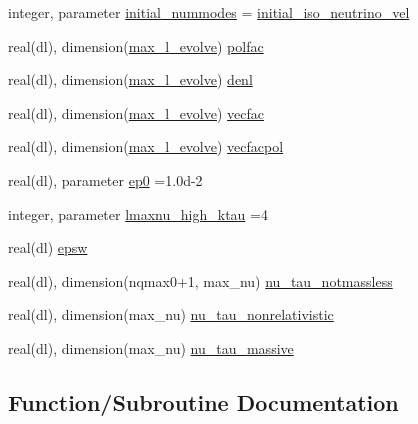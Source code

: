 \begin{DoxyCompactItemize}
\item 
integer, parameter \mbox{\hyperlink{namespacegaugeinterface_a4c1f07aacc342a123210732254937539}{initial\+\_\+nummodes}} = \mbox{\hyperlink{namespacegaugeinterface_a47175df2f7681cf8e8a2a7e2cb94952a}{initial\+\_\+iso\+\_\+neutrino\+\_\+vel}}
\item 
real(dl), dimension(\mbox{\hyperlink{namespacegaugeinterface_a965f8caba9ba282e718281110e274b04}{max\+\_\+l\+\_\+evolve}}) \mbox{\hyperlink{namespacegaugeinterface_a6e217a5a543d2b9517624820de0e3338}{polfac}}
\item 
real(dl), dimension(\mbox{\hyperlink{namespacegaugeinterface_a965f8caba9ba282e718281110e274b04}{max\+\_\+l\+\_\+evolve}}) \mbox{\hyperlink{namespacegaugeinterface_ad67d0af8f042d5a80e3890d8a794be5f}{denl}}
\item 
real(dl), dimension(\mbox{\hyperlink{namespacegaugeinterface_a965f8caba9ba282e718281110e274b04}{max\+\_\+l\+\_\+evolve}}) \mbox{\hyperlink{namespacegaugeinterface_adc490d2cf60b4b4224f782920c48141a}{vecfac}}
\item 
real(dl), dimension(\mbox{\hyperlink{namespacegaugeinterface_a965f8caba9ba282e718281110e274b04}{max\+\_\+l\+\_\+evolve}}) \mbox{\hyperlink{namespacegaugeinterface_ae0aebf1ba68b305cd9abbe8bf79353d9}{vecfacpol}}
\item 
real(dl), parameter \mbox{\hyperlink{namespacegaugeinterface_ac46c357baba62f4aeaaec10b492d6e80}{ep0}} =1.\+0d-\/2
\item 
integer, parameter \mbox{\hyperlink{namespacegaugeinterface_a55cb8dcd9b184efebb1f82f7dbd5bf19}{lmaxnu\+\_\+high\+\_\+ktau}} =4
\item 
real(dl) \mbox{\hyperlink{namespacegaugeinterface_a7958da73f55e60b6e679c0a7f70ec822}{epsw}}
\item 
real(dl), dimension(nqmax0+1, max\+\_\+nu) \mbox{\hyperlink{namespacegaugeinterface_a041cc4df547c2fb25f42679b34de4891}{nu\+\_\+tau\+\_\+notmassless}}
\item 
real(dl), dimension(max\+\_\+nu) \mbox{\hyperlink{namespacegaugeinterface_aa6ec574b0c9183eb8881d0ed0376740c}{nu\+\_\+tau\+\_\+nonrelativistic}}
\item 
real(dl), dimension(max\+\_\+nu) \mbox{\hyperlink{namespacegaugeinterface_aecf1aff36254ca033f48a9a0bcf5416c}{nu\+\_\+tau\+\_\+massive}}
\end{DoxyCompactItemize}


\subsection{Function/\+Subroutine Documentation}
\mbox{\label{namespacegaugeinterface_a8565dc876beb9e4339c005a72333f31f}} 
